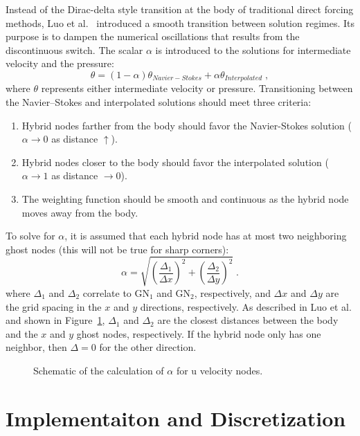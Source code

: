 \documentclass[onehalf,11pt]{beavtex}
\begin{document}
Instead of the Dirac-delta style transition at the body of traditional direct forcing methods, Luo et al.~\cite{Luo:2012gx} introduced a smooth transition between solution regimes.
Its purpose is to dampen the numerical oscillations that results from the discontinuous switch. 
The scalar $\alpha$ is introduced to the solutions for intermediate velocity and the pressure:
\begin{equation}\label{eq:Weight}
\theta = \left(1-\alpha \right)\theta_{Navier-Stokes} + \alpha \theta_{Interpolated} \;,
\end{equation}
where $\theta$ represents either intermediate velocity or pressure.
Transitioning between the Navier--Stokes and interpolated solutions should meet three criteria:
\begin{enumerate}
	\item Hybrid nodes farther from the body should favor the Navier-Stokes solution ($\alpha \rightarrow 0$ as distance $\uparrow$).
	\item Hybrid nodes closer to the body should favor the interpolated solution ($\alpha \rightarrow 1$ as distance $ \rightarrow 0$).
	\item The weighting function should be smooth and continuous as the hybrid node moves away from the body.
\end{enumerate}
To solve for $\alpha$, it is assumed that each hybrid node has at most two neighboring ghost nodes (this will not be true for sharp corners):
\begin{equation}
\alpha = \sqrt{\left(\frac{\Delta_1}{\Delta x}\right)^2 + \left(\frac{\Delta_2}{\Delta y}\right)^2} \;.
\label{eq:Alpha}
\end{equation}
where $\Delta_1$ and $\Delta_2$ correlate to GN$_1$ and GN$_2$, respectively, and $\Delta x$ and $\Delta y$ are the grid spacing in the $x$ and $y$ directions, respectively. 
As described in Luo et al. and shown in Figure~\ref{fig:Weight}, $\Delta_1$ and $\Delta_2$ are the closest distances between the body and the $x$ and $y$ ghost nodes, respectively. 
If the hybrid node only has one neighbor, then $\Delta=0$ for the other direction. 
\begin{figure}[htb]
	\centering
	
	\caption{Schematic of the calculation of $\alpha$ for u velocity nodes.}
	\label{fig:Weight}
\end{figure}

\chapter{Implementaiton and Discretization}\label{chapter:Implementation}
\end{document}
